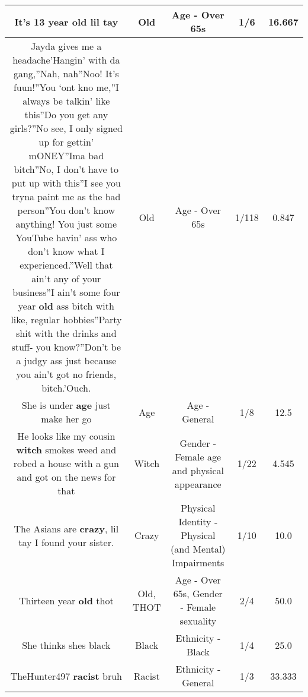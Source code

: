 \documentclass[11pt]{article}
\newlength\mylength
\begin{document}
\begin{center}
\begin{longtable}{|C{.65\mylength}|C{.30\mylength}|C{.12\mylength}|C{.12\mylength}|C{.12\mylength}|}
  \small It's 13 year \textbf{old} lil tay\normalsize   & Old & Age - Over 65s & 1/6 & 16.667 \\  \hline
  \small Jayda gives me a headache'Hangin' with da gang,''Nah, nah''Noo! It's fuun!''You ‘ont kno me,''I always be talkin' like this''Do you get any girls?''No see, I only signed up for gettin' mONEY''Ima bad bitch''No, I don't have to put up with this''I see you tryna paint me as the bad person''You don't know anything! You just some YouTube havin' ass who don't know what I experienced.''Well that ain't any of your business''I ain't some four year \textbf{old} ass bitch with like, regular hobbies''Party shit with the drinks and stuff- you know?''Don't be a judgy ass just because you ain't got no friends, bitch.'Ouch.\normalsize   & Old & Age - Over 65s & 1/118 & 0.847 \\  \hline
  \small She is under \textbf{age} just make her go\normalsize   & Age & Age - General & 1/8 & 12.5 \\  \hline
  \small He looks like my cousin \textbf{witch} smokes weed and robed a house with a gun and got on the news for that\normalsize   & Witch & Gender - Female age and physical appearance & 1/22 & 4.545 \\  \hline
  \small The Asians are \textbf{crazy}, lil tay I found your sister.\normalsize   & Crazy & Physical Identity - Physical (and Mental) Impairments & 1/10 & 10.0 \\  \hline
  \small Thirteen year \textbf{old} thot\normalsize   & Old, THOT & Age - Over 65s, Gender - Female sexuality & 2/4 & 50.0 \\  \hline
  \small She thinks shes black\normalsize   & Black & Ethnicity - Black & 1/4 & 25.0 \\  \hline
  \small TheHunter497 \textbf{racist} bruh\normalsize   & Racist & Ethnicity - General & 1/3 & 33.333 \\  \hline

\end{longtable}
\end{center}
\end{document}
